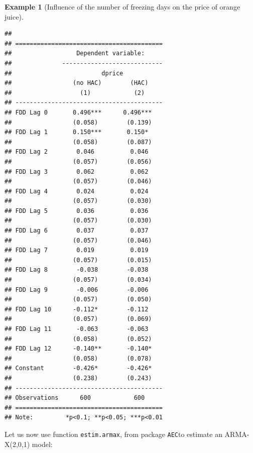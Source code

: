 \documentclass[
  12pt,
]{book}
\theoremstyle{definition}
\theoremstyle{definition}
\newtheorem{example}{Example}[chapter]
\theoremstyle{definition}
\theoremstyle{definition}
\theoremstyle{remark}
\begin{document}
\begin{example}[Influence of the number of freezing days on the price of orange juice]
\begin{verbatim}
## 
## =========================================
##                  Dependent variable:     
##              ----------------------------
##                         dprice           
##                 (no HAC)        (HAC)    
##                   (1)            (2)     
## -----------------------------------------
## FDD Lag 0       0.496***      0.496***   
##                 (0.058)        (0.139)   
## FDD Lag 1       0.150***       0.150*    
##                 (0.058)        (0.087)   
## FDD Lag 2        0.046          0.046    
##                 (0.057)        (0.056)   
## FDD Lag 3        0.062          0.062    
##                 (0.057)        (0.046)   
## FDD Lag 4        0.024          0.024    
##                 (0.057)        (0.030)   
## FDD Lag 5        0.036          0.036    
##                 (0.057)        (0.030)   
## FDD Lag 6        0.037          0.037    
##                 (0.057)        (0.046)   
## FDD Lag 7        0.019          0.019    
##                 (0.057)        (0.015)   
## FDD Lag 8        -0.038        -0.038    
##                 (0.057)        (0.034)   
## FDD Lag 9        -0.006        -0.006    
##                 (0.057)        (0.050)   
## FDD Lag 10      -0.112*        -0.112    
##                 (0.057)        (0.069)   
## FDD Lag 11       -0.063        -0.063    
##                 (0.058)        (0.052)   
## FDD Lag 12      -0.140**       -0.140*   
##                 (0.058)        (0.078)   
## Constant        -0.426*        -0.426*   
##                 (0.238)        (0.243)   
## -----------------------------------------
## Observations      600            600     
## =========================================
## Note:         *p<0.1; **p<0.05; ***p<0.01
\end{verbatim}

Let us now use function \texttt{estim.armax}, from package \texttt{AEC}to estimate an ARMA-X(2,0,1) model:


\end{example}
\end{document}
